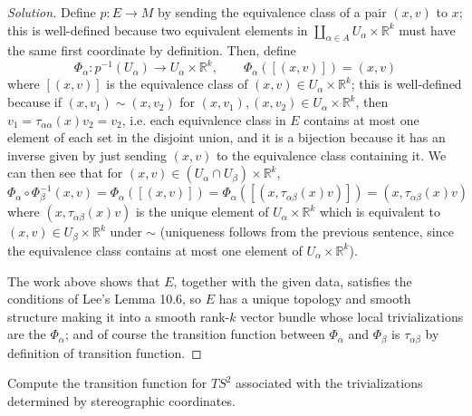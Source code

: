 \documentclass[10pt]{article}
\providecommand{\RR}{\mathbb R}
\providecommand{\inv}{^{-1}}
\newenvironment{soln}{\begin{proof}[Solution]}{\end{proof}}
\begin{document}
\begin{soln}
    Define $p\colon E\to M$ by sending the equivalence class of
    a pair $(x,v)$ to $x$; this is well-defined because
    two equivalent elements in $\coprod_{\alpha\in A}U_\alpha\times\RR^k$
    must have the same first coordinate by definition.
    Then, define
    \begin{equation*}
        \Phi_\alpha\colon p\inv(U_\alpha)\to U_\alpha\times\RR^k,\qquad
	\Phi_\alpha([(x,v)]) = (x,v)
    \end{equation*}
    where $[(x,v)]$ is the equivalence class of
    $(x,v)\in U_\alpha\times\RR^k$;
    this is well-defined because if $(x,v_1)\sim(x,v_2)$
    for $(x,v_1),(x,v_2)\in U_\alpha\times\RR^k$, then
    $v_1 = \tau_{\alpha\alpha}(x)v_2 = v_2$,
    i.e. each equivalence class in $E$ contains at most one element
    of each set in the disjoint union, and it is a bijection
    because it has an inverse given by just sending $(x,v)$
    to the equivalence class containing it. We can then see that
    for $(x,v)\in (U_\alpha\cap U_\beta)\times\RR^k$,
    \begin{equation*}
        \Phi_\alpha\circ\Phi_\beta\inv(x,v)
	= \Phi_\alpha([(x,v)])
	= \Phi_\alpha([(x,\tau_{\alpha\beta}(x)v)])
	= (x,\tau_{\alpha\beta}(x)v)
    \end{equation*}
    where $(x,\tau_{\alpha\beta}(x)v)$ is the unique element
    of $U_\alpha\times\RR^k$ which is equivalent to
    $(x,v)\in U_\beta\times\RR^k$ under $\sim$
    (uniqueness follows from the previous sentence,
    since the equivalence class contains at most
    one element of $U_\alpha\times\RR^k$).

    The work above shows that $E$, together with the given data,
    satisfies the conditions of Lee's Lemma 10.6,
    so $E$ has a unique topology and smooth structure
    making it into a smooth rank-$k$ vector bundle
    whose local trivializations are the $\Phi_\alpha$;
    and of course the transition function
    between $\Phi_\alpha$ and $\Phi_\beta$ is $\tau_{\alpha\beta}$
    by definition of transition function.
\end{soln}

\begin{problem}
    [10-7]
    Compute the transition function for $TS^2$ associated with
    the trivializations determined by stereographic coordinates.
\end{problem}
\end{document}
